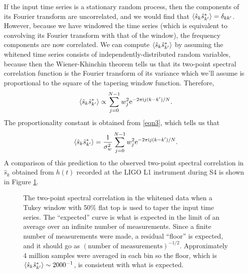 \documentclass[10pt]{article}
\begin{document}
If the input time series is a stationary random process, then the
components of its Fourier transform are uncorrelated, and we would find
that \(\left\langle\hat{s}_{k} \hat{s}^{*}_{k'}\right\rangle = \delta_{k k'}\).  However,
because we have windowed the time series (which is equivalent to convolving
its Fourier transform with that of the window), the frequency components
are now correlated.  We can compute \(\left\langle\hat{s}_{k}
\hat{s}^{*}_{k'}\right\rangle\) by assuming the whitened time series consists of
independently-distributed random variables, because then the
Wiener-Khinchin theorem tells us that its two-point spectral correlation
function is the Fourier transform of its variance which we'll assume is
proportional to the square of the tapering window function.  Therefore,
\begin{equation}
\left\langle\hat{s}_{k} \hat{s}^{*}_{k'}\right\rangle
   \propto \sum_{j = 0}^{N - 1} w_{j}^{2} \mathrm{e}^{-2 \pi \mathrm{i} j (k - k') / N}.
\end{equation}
The proportionality constant is obtained from \eqref{eqn3}, which tells us
that
\begin{equation}
\label{eqn4}
\left\langle\hat{s}_{k} \hat{s}^{*}_{k'}\right\rangle
   = \frac{1}{\sigma_{w}^{2}} \sum_{j = 0}^{N - 1} w_{j}^{2} \mathrm{e}^{-2 \pi
   \mathrm{i} j (k - k') / N}.
\end{equation}
A comparison of this prediction to the observed two-point spectral
correlation in \(\hat{s}_{k}\) obtained from \(h(t)\) recorded at the LIGO
L1 instrument during S4 is shown in Figure \ref{fig:sksk}.
\begin{figure}
\begin{center}
\end{center}
\caption{The two-point spectral correlation in the whitened data when a
Tukey window with 50\% flat top is used to taper the input time series.
The ``expected'' curve is what is expected in the limit of an average over
an infinite number of measurements.  Since a finite number of measurements
were made, a residual ``floor'' is expected, and it should go as
\((\text{number of measurements})^{-1/2}\).  Approximately 4 million
samples were averaged in each bin so the floor, which is
\(\left\langle\hat{s}_{k} \hat{s}^{*}_{k'}\right\rangle \sim 2000^{-1}\), is consistent
with what is expected.}
\label{fig:sksk}
\end{figure}
\end{document}
